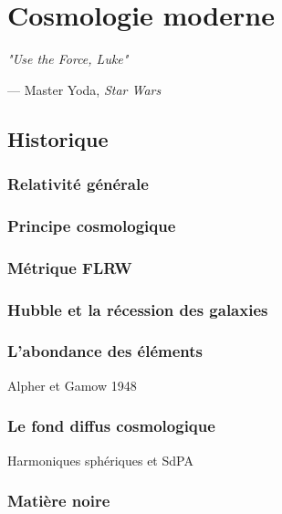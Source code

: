 
\chapter{Cosmologie moderne} %

\label{Chapter1} %


\epigraph{\textit{"Use the Force, Luke"}}{\par\raggedleft--- \textup{Master Yoda}, \textit{Star Wars}}



\section{Historique}

\subsection{Relativité générale}
\subsection{Principe cosmologique}
\subsection{Métrique FLRW}
\subsection{Hubble et la récession des galaxies}
\subsection{L'abondance des éléments}
Alpher et Gamow 1948
\subsection{Le fond diffus cosmologique}
Harmoniques sphériques et SdPA
\subsection{Matière noire}
